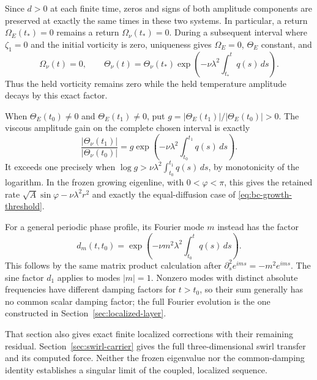 Since $d>0$ at each finite time, zeros and signs of both amplitude
components are preserved at exactly the same times in these two
systems. In particular, a return $\Omega_E(t_*)=0$ remains a return
$\Omega_\nu(t_*)=0$. During a subsequent interval where $\zeta_1=0$
and the initial vorticity is zero, uniqueness gives $\Omega_E=0$,
$\Theta_E$ constant, and
\[
 \Omega_\nu(t)=0,\qquad
 \Theta_\nu(t)=\Theta_\nu(t_*)
 \exp\left(-\nu\lambda^2\int_{t_*}^tq(s)\,ds\right).
\]
Thus the held vorticity remains zero while the held temperature
amplitude decays by this exact factor.

When $\Theta_E(t_0)\ne0$ and $\Theta_E(t_1)\ne0$, put
$g=|\Theta_E(t_1)|/|\Theta_E(t_0)|>0$.
The viscous amplitude gain on the complete chosen interval is exactly
\begin{equation}\label{eq:bc-cycle-gain}
 \frac{|\Theta_\nu(t_1)|}{|\Theta_\nu(t_0)|}
 =g\exp\left(-\nu\lambda^2\int_{t_0}^{t_1}q(s)\,ds\right).
\end{equation}
It exceeds one precisely when
$\log g>\nu\lambda^2\int_{t_0}^{t_1}q(s)\,ds$, by monotonicity
of the logarithm. In the frozen growing eigenline, with
$0<\varphi<\pi$, this gives the retained rate
$\sqrt A\sin\varphi-\nu\lambda^2r^2$ and exactly the equal-diffusion
case of \eqref{eq:bc-growth-threshold}.

For a general periodic phase profile, its Fourier mode $m$ instead
has the factor
\[
 d_m(t,t_0)=\exp\left(-\nu m^2\lambda^2
                                  \int_{t_0}^tq(s)\,ds\right).
\]
This follows by the same matrix product calculation after
$\partial_s^2e^{ims}=-m^2e^{ims}$. The sine factor $d_1$ applies to
modes $|m|=1$. Nonzero modes with distinct absolute frequencies have
different damping factors for $t>t_0$, so their sum generally has no
common scalar damping factor;
the full Fourier evolution is the one constructed in
Section~\ref{sec:localized-layer}.

That section also gives exact finite localized corrections with their
remaining residual. Section~\ref{sec:swirl-carrier} gives the full
three-dimensional swirl transfer and its computed force. Neither the
frozen eigenvalue nor the common-damping identity establishes a
singular limit of the coupled, localized sequence.
